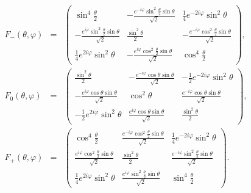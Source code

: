 \documentclass[fleqn,twoside]{article}      %
\begin{document}
\begin{equation}
\begin{array}{rcl}
F_{-}(\theta ,\varphi) &=&
\left(
\begin{array}{ccc}
\sin ^4\frac{\theta }{2} & -\frac{e^{-i \varphi } \sin ^2\frac{\theta }{2} \sin \theta }{\sqrt{2}} & \frac{1}{4} e^{-2 i \varphi } \sin ^2\theta  \\
 -\frac{e^{i \varphi } \sin ^2\frac{\theta }{2} \sin \theta }{\sqrt{2}} & \frac{\sin ^2\theta }{2} & -\frac{e^{-i \varphi } \cos^2 \frac{\theta}{2} \sin \theta }{\sqrt{2}} \\
 \frac{1}{4} e^{2 i \varphi } \sin ^2\theta  & -\frac{e^{i \varphi } \cos^2 \frac{\theta}{2} \sin \theta }{ \sqrt{2}} & \cos ^4\frac{\theta }{2}
\end{array}
\right),
   \\
F_{0}(\theta ,\varphi) &=&
 \left(
\begin{array}{ccc}
\frac{\sin ^2\theta }{2} & -\frac{e^{-i \varphi } \cos \theta  \sin \theta }{\sqrt{2}} & -\frac{1}{2} e^{-2 i \varphi } \sin ^2\theta  \\
 -\frac{e^{i \varphi } \cos \theta  \sin \theta }{\sqrt{2}} & \cos ^2\theta  & \frac{e^{-i \varphi } \cos \theta  \sin \theta }{\sqrt{2}} \\
 -\frac{1}{2} e^{2 i \varphi } \sin ^2\theta  & \frac{e^{i \varphi } \cos \theta  \sin \theta }{\sqrt{2}} & \frac{\sin ^2\theta }{2}
\end{array}
\right),
\\
F_{+}(\theta ,\varphi) &=&
 \left(
\begin{array}{ccc}
\cos ^4\frac{\theta }{2} & \frac{e^{-i \varphi } \cos^2 \frac{\theta}{2} \sin \theta }{ \sqrt{2}} & \frac{1}{4} e^{-2 i \varphi } \sin ^2\theta  \\
 \frac{e^{i \varphi } \cos^2 \frac{\theta}{2} \sin \theta }{ \sqrt{2}} & \frac{\sin ^2\theta }{2} & \frac{e^{-i \varphi } \sin ^2\frac{\theta }{2} \sin \theta }{\sqrt{2}} \\
 \frac{1}{4} e^{2 i \varphi } \sin ^2\theta  & \frac{e^{i \varphi } \sin ^2\frac{\theta }{2} \sin \theta }{\sqrt{2}} & \sin ^4\frac{\theta }{2}
\end{array}
\right)
.
\end{array}
\label{e-2009-gtq-s2f}
\end{equation}
\end{document}

